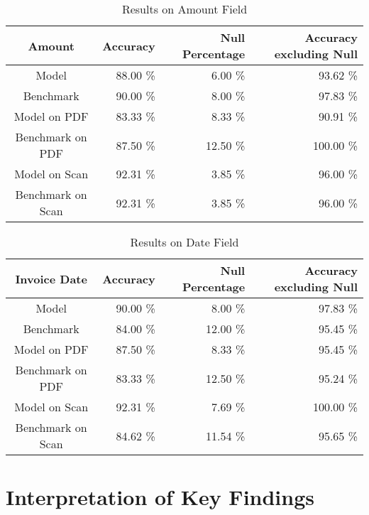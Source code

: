 \begin{table}[ht]   %
    \centering
    \footnotesize
    \begin{tabular}{c|rrr} %
        \toprule    %
        Amount  & Accuracy  & Null Percentage & Accuracy excluding Null \\
        \midrule    %
        Model               & 88.00 \%   & 6.00 \%   & 93.62 \% \\
        Benchmark           & 90.00 \%   & 8.00 \%  & 97.83 \%\\
        \midrule    %
        Model on PDF        & 83.33 \%   & 8.33 \%  & 90.91 \% \\
        Benchmark on PDF    & 87.50 \%   & 12.50 \%  & 100.00 \% \\
        \midrule    %
        Model on Scan       & 92.31 \%  & 3.85 \%   & 96.00 \% \\
        Benchmark on Scan   & 92.31 \%  & 3.85 \%  & 96.00 \% \\

        \bottomrule %
    \end{tabular}
    \caption{Results on Amount Field}
    \label{table:Model_Bench_Amount}
\end{table}
\begin{table}[ht]   %
    \centering
    \footnotesize
    \begin{tabular}{c|rrr} %
        \toprule    %
        Invoice Date  & Accuracy  & Null Percentage & Accuracy excluding Null \\
        \midrule    %
        Model               & 90.00 \%   & 8.00 \%   & 97.83 \% \\
        Benchmark           & 84.00 \%   & 12.00 \%  & 95.45 \%\\
        \midrule    %
        Model on PDF        & 87.50 \%   & 8.33 \%  & 95.45 \% \\
        Benchmark on PDF    & 83.33 \%   & 12.50 \%  & 95.24 \% \\
        \midrule    %
        Model on Scan       & 92.31 \%  & 7.69 \%   & 100.00 \% \\
        Benchmark on Scan   & 84.62 \%  & 11.54 \%  & 95.65 \% \\

        \bottomrule %
    \end{tabular}
    \caption{Results on Date Field}
    \label{table:Model_Bench_Date}
\end{table}

\newpage
\section{Interpretation of Key Findings}